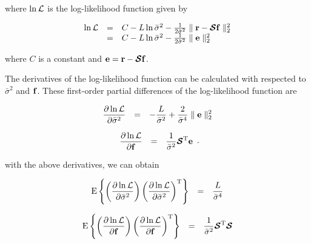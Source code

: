 \documentclass[a4paper,11pt,fleqn]{article}
\newcommand{\br}{{\mathbf r}}
\newcommand{\bbf}{{\bf f}}
\newcommand{\bcS}{{\mbox {\boldmath ${\cal S}$}}}
\begin{document}
\noindent where $\ln{\cal L}$ is the log-likelihood function given
by

\begin{equation}
\begin{array}{rcl}
\ln{\cal L}&=&C-L\ln\bar{\sigma}^2-\frac{1}{2\bar{\sigma}^2}\parallel\br-\bcS\bbf\parallel_2^2\\
&=&C-L\ln\bar{\sigma}^2-\frac{1}{2\bar{\sigma}^2}\parallel\mathbf{e}\parallel_2^2
\end{array}\label{logl}
\end{equation}

\noindent where $C$ is a constant and $\mathbf{e}=\br-\bcS\bbf$.

The derivatives of the log-likelihood function can be calculated
with respected to $\bar{\sigma}^2$ and $\bbf$. These first-order
partial differences of the log-likelihood function are


\begin{equation}
\begin{array}{rcl}
\displaystyle{\partial\ln{\cal
L}\over\partial\bar{\sigma}^2}&=&-\displaystyle{L\over\bar{\sigma}^2}+\displaystyle{2\over\bar{\sigma}^4}\parallel\mathbf{e}\parallel_2^2
\end{array}
\end{equation}

\begin{equation}
\begin{array}{rcl}
\displaystyle{\partial\ln{\cal
L}\over\partial\bbf}&=&\displaystyle{1\over\bar{\sigma}^2}\bcS^{\rm
T}\mathbf{e}
\end{array}.
\end{equation}

\noindent with the above derivatives, we can obtain

\begin{equation}
\begin{array}{rcl}
{\rm E}\left\{\left(\displaystyle{\partial\ln{\cal
L}\over\partial\bar{\sigma}^2}\right)\left(\displaystyle{\partial\ln{\cal
L}\over\partial\bar{\sigma}^2}\right)^{\rm
T}\right\}&=&\displaystyle{L\over\bar{\sigma}^4}
\end{array}
\end{equation}

\begin{equation}
\begin{array}{rcl}
{\rm E}\left\{\left(\displaystyle{\partial\ln{\cal
L}\over\partial\bbf}\right)\left(\displaystyle{\partial\ln{\cal
L}\over\partial\bbf}\right)^{\rm
T}\right\}&=&\displaystyle{1\over\bar{\sigma}^2}\bcS^{\rm T}\bcS
\end{array}
\end{equation}
\end{document}
